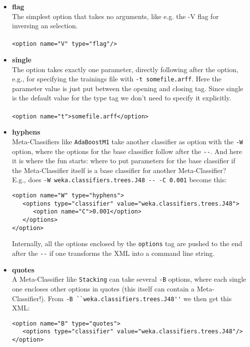 \begin{itemize}
\item \textbf{flag}\\
The simplest option that takes no arguments, like e.g. the -V flag for inversing an selection.\\\\
\verb^<option name="V" type="flag"/>^
\item \textbf{single}\\ 
The option takes exactly one parameter,
  directly following after the option, e.g., for specifying the
  trainings file with \verb=-t somefile.arff=. Here the parameter value is
  just put between the opening and closing tag. Since single is the
  default value for the type tag we don't need to specify it
  explicitly.\\\\
\verb^<option name="t">somefile.arff</option>^
\item \textbf{hyphens}\\
Meta-Classifiers like \verb=AdaBoostM1= take another classifier as option
with the \verb=-W= option, where the options for the base classifier follow
after the \verb=--=. And here it is where the fun starts: where to put
parameters for the base classifier if the Meta-Classifier itself is a
base classifier for another Meta-Classifier?\\

E.g., does \verb=-W weka.classifiers.trees.J48 -- -C 0.001= become this:
\begin{verbatim}
<option name="W" type="hyphens">
   <options type="classifier" value="weka.classifiers.trees.J48">
      <option name="C">0.001</option>
   </options>
</option>
\end{verbatim}

\noindent Internally, all the options enclosed by the \verb=options= tag are
pushed to the end after the \verb=--= if one transforms the XML into a
command line string.

\item \textbf{quotes}\\
A Meta-Classifier like \verb=Stacking= can take several \verb=-B= options, where
each single one encloses other options in quotes (this itself can
contain a Meta-Classifier!). From \verb=-B ``weka.classifiers.trees.J48''= we
then get this XML:\\
\begin{verbatim}
<option name="B" type="quotes">
   <options type="classifier" value="weka.classifiers.trees.J48"/>
</option>
\end{verbatim}


\end{itemize}
